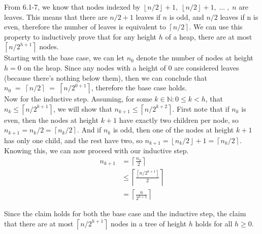\documentclass[11pt]{article}
\def\lc{\left\lceil}
\def\rc{\right\rceil}
\def\lf{\left\lfloor}
\def\rf{\right\rfloor}
\begin{document}
 From 6.1-7, we know that nodes indexed by $\lf n/2 \rf + 1, \; \lf n/2 \rf + 1, \; ... \;,\; n$
 are leaves.  This means that there are $n/2 + 1$ leaves if $n$ is odd, and $n/2$ leaves if n is even,
 therefore the number of leaves is equivalent to $\lc n/2 \rc$.  We can use this property to inductively 
 prove that for any height $h$ of a heap, there are at most $\lc n/2^{h+1} \rc$ nodes. \\

 Starting with the base case, we can let $n_0$ denote the number of nodes at height $h=0$ on the heap.
 Since any nodes with a height of 0 are considered leaves (because there's nothing below them), then we
 can conclude that $n_0 \;=\; \lc n/2 \rc \;=\; \lc n/2^{0+1} \rc$, therefore the base case holds. \\

 Now for the inductive step.  Assuming, for some $k \in \mathbb{N} : 0 \leq k < h$, that 
 $ n_k \leq \lc n/2^{k+1} \rc $, we will show that $n_{k+1} \leq \lc n/2^{k+2} \rc$.  First note that if $n_k$
 is even, then the nodes at height $k+1$ have exactly two children per node, so $n_{k+1}=n_k/2=\lc n_k/2 \rc$. 
 And if $n_k$ is odd, then one of the nodes at height $k+1$ has only one child, and the rest have two, so
 $n_{k+1} = \lf n_k/2 \rf + 1 = \lc n_k/2 \rc$.  Knowing this, we can now proceed with our inductive step.
 \begin{align*}
   && n_{k+1} &= \lc \frac{n_k}{2} \rc && \\
   && &\leq \lc \frac{\lc n/2^{k+1} \rc}{2} \rc && \\
   && &= \lc \frac{n}{2^{k+2}} \rc &&
 \end{align*}

 Since the claim holds for both the base case and the inductive step, the claim that there are at most 
 $\lc n/2^{h+1} \rc$ nodes in a tree of height $h$ holds for all $h \geq 0$.
\end{document}
